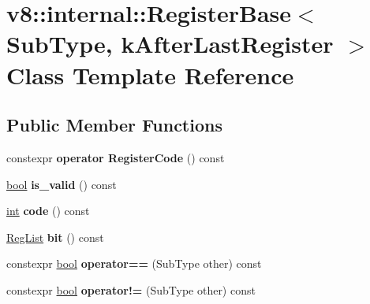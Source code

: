 \hypertarget{classv8_1_1internal_1_1RegisterBase}{}\section{v8\+:\+:internal\+:\+:Register\+Base$<$ Sub\+Type, k\+After\+Last\+Register $>$ Class Template Reference}
\label{classv8_1_1internal_1_1RegisterBase}
\subsection*{Public Member Functions}
\begin{DoxyCompactItemize}
\item 
\mbox{\label{classv8_1_1internal_1_1RegisterBase_a7e2b55b58447de993cab1171d5e46ee0}} 
constexpr {\bfseries operator Register\+Code} () const
\item 
\mbox{\label{classv8_1_1internal_1_1RegisterBase_ab4edadb64159d517dd8c8fcfd989d316}} 
\mbox{\hyperlink{classbool}{bool}} {\bfseries is\+\_\+valid} () const
\item 
\mbox{\label{classv8_1_1internal_1_1RegisterBase_a555a95027a790b38d9f719ba79c2ade4}} 
\mbox{\hyperlink{classint}{int}} {\bfseries code} () const
\item 
\mbox{\label{classv8_1_1internal_1_1RegisterBase_a158888485d9fd68a93a7e3cac1834880}} 
\mbox{\hyperlink{classuint32__t}{Reg\+List}} {\bfseries bit} () const
\item 
\mbox{\label{classv8_1_1internal_1_1RegisterBase_a7778852fa06f4fa42e2bc38aee047c17}} 
constexpr \mbox{\hyperlink{classbool}{bool}} {\bfseries operator==} (Sub\+Type other) const
\item 
\mbox{\label{classv8_1_1internal_1_1RegisterBase_accd5df1f56bf6941cb449c941e2bbb87}} 
constexpr \mbox{\hyperlink{classbool}{bool}} {\bfseries operator!=} (Sub\+Type other) const
\end{DoxyCompactItemize}

